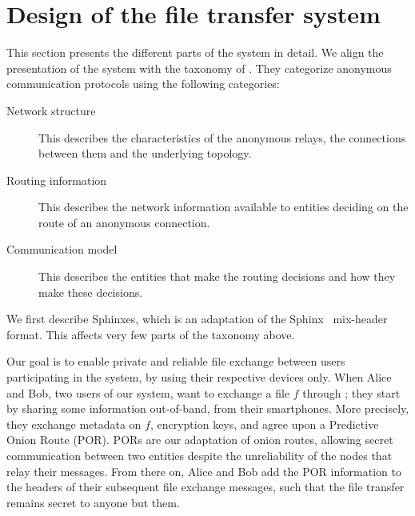 \section{Design of the \name file transfer system}%
\label{design}

This section presents the different parts of the system in detail.
We align the presentation of the system with the taxonomy of 
\textcite{RoutingSurveyAnonymousProtocols}.
They categorize anonymous communication protocols using the following 
categories:
\begin{description}
  \item[Network structure]
    This describes the characteristics of the anonymous relays, the connections 
    between them and the underlying topology.

  \item[Routing information]
    This describes the network information available to entities deciding on 
    the route of an anonymous connection.

  \item[Communication model]
    This describes the entities that make the routing decisions and how they 
    make these decisions.
\end{description}

We first describe Sphinxes, which is an adaptation of the Sphinx~\cite{Sphinx} 
mix-header format.
This affects very few parts of the taxonomy above.

Our goal is to enable private and reliable file exchange between users participating in the system, by using their respective devices only.
When Alice and Bob, two users of our system, want to exchange a file $f$ 
through \name; they start by sharing some information out-of-band, \eg from 
their smartphones.
More precisely, they exchange metadata on $f$, encryption keys, and agree upon a Predictive Onion Route (POR).
PORs are our adaptation of onion routes, allowing secret communication between two entities despite the unreliability of the nodes that relay their messages.
From there on, Alice and Bob add the POR information to the headers of their subsequent file exchange messages, such that the file transfer remains secret to anyone but them.

